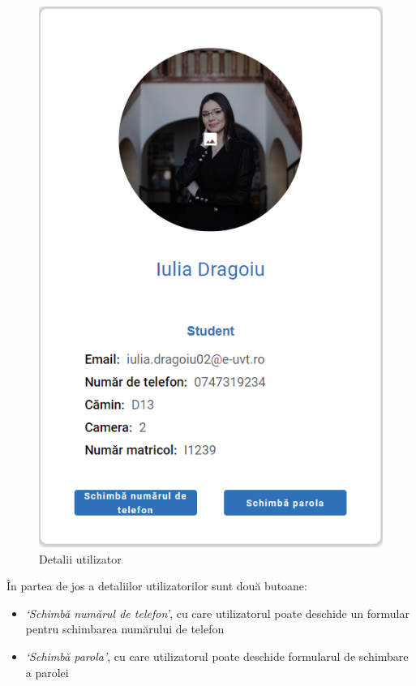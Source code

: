 \documentclass[12pt,a4paper]{report}
\theoremstyle{definition}
\theoremstyle{remark}
\begin{document}
\begin{figure}[H]
    \centering
    \includegraphics[width=0.4 \linewidth,height=0.4\textheight]{resurse/ghid_utilizare/detalii_profil.png}
    \caption{Detalii utilizator}
\end{figure}

\par În partea de jos a detaliilor utilizatorilor sunt două butoane:

\begin{itemize}
    \item \textit{`Schimbă numărul de telefon'}, cu care utilizatorul poate deschide un formular pentru schimbarea numărului de telefon
    \item \textit{`Schimbă parola'}, cu care utilizatorul poate deschide formularul de schimbare a parolei
\end{itemize}
\end{document}
